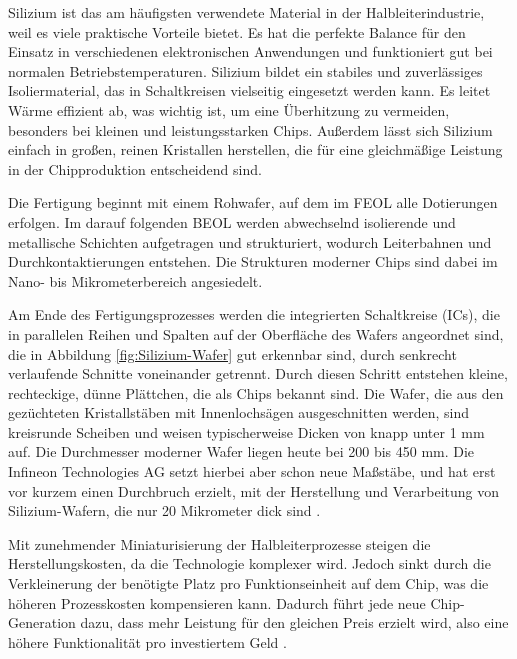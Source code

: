 Silizium ist das am häufigsten verwendete Material in der Halbleiterindustrie, weil es viele praktische Vorteile bietet. Es hat die perfekte Balance für den Einsatz in verschiedenen elektronischen Anwendungen und funktioniert gut bei normalen Betriebstemperaturen. Silizium bildet ein stabiles und zuverlässiges Isoliermaterial, das in Schaltkreisen vielseitig eingesetzt werden kann. Es leitet Wärme effizient ab, was wichtig ist, um eine Überhitzung zu vermeiden, besonders bei kleinen und leistungsstarken Chips. Außerdem lässt sich Silizium einfach in großen, reinen Kristallen herstellen, die für eine gleichmäßige Leistung in der Chipproduktion entscheidend sind.

Die Fertigung beginnt mit einem Rohwafer, auf dem im \ac{FEOL} alle Dotierungen erfolgen. Im darauf folgenden \ac{BEOL} werden abwechselnd isolierende und metallische Schichten aufgetragen und strukturiert, wodurch Leiterbahnen und Durchkontaktierungen entstehen. Die Strukturen moderner Chips sind dabei im Nano- bis Mikrometerbereich angesiedelt.

Am Ende des Fertigungsprozesses werden die integrierten Schaltkreise (\acp{IC}), die in parallelen Reihen und Spalten auf der Oberfläche des Wafers angeordnet sind, die in Abbildung \ref{fig:Silizium-Wafer} gut erkennbar sind, durch senkrecht verlaufende Schnitte voneinander getrennt. Durch diesen Schritt entstehen kleine, rechteckige, dünne Plättchen, die als Chips bekannt sind. Die Wafer, die aus den gezüchteten Kristallstäben mit Innenlochsägen ausgeschnitten werden, sind kreisrunde Scheiben und weisen typischerweise Dicken von knapp unter 1 mm auf. Die Durchmesser moderner Wafer liegen heute bei 200 bis 450 mm. Die Infineon Technologies AG setzt hierbei aber schon neue Maßstäbe, und hat erst vor kurzem einen Durchbruch erzielt, mit der Herstellung und Verarbeitung von Silizium-Wafern, die nur 20 Mikrometer dick sind \cite{infineon2024dünnsterWafer}.

Mit zunehmender Miniaturisierung der Halbleiterprozesse steigen die Herstellungskosten, da die Technologie komplexer wird. Jedoch sinkt durch die Verkleinerung der benötigte Platz pro Funktionseinheit auf dem Chip, was die höheren Prozesskosten kompensieren kann. Dadurch führt jede neue Chip-Generation dazu, dass mehr Leistung für den gleichen Preis erzielt wird, also eine höhere Funktionalität pro investiertem Geld \cite{lienig2023halbleitertechnologie}.